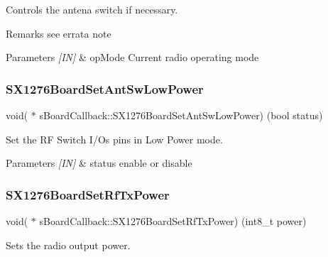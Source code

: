 Controls the antena switch if necessary. 

\begin{DoxyRemark}{Remarks}
see errata note
\end{DoxyRemark}

\begin{DoxyParams}{Parameters}
{\em \mbox{[}\+I\+N\mbox{]}} & op\+Mode Current radio operating mode \\
\hline
\end{DoxyParams}
\mbox{\label{structsBoardCallback_a91d44db14871cfcf950cce928922ba17}} 
\subsubsection{\texorpdfstring{S\+X1276\+Board\+Set\+Ant\+Sw\+Low\+Power}{SX1276BoardSetAntSwLowPower}}
{\footnotesize\ttfamily void( $\ast$ s\+Board\+Callback\+::\+S\+X1276\+Board\+Set\+Ant\+Sw\+Low\+Power) (bool status)}



Set the RF Switch I/\+Os pins in Low Power mode. 


\begin{DoxyParams}{Parameters}
{\em \mbox{[}\+I\+N\mbox{]}} & status enable or disable \\
\hline
\end{DoxyParams}
\mbox{\label{structsBoardCallback_aec7b6d1c4de061f3d2f1bebe75c64c13}} 
\subsubsection{\texorpdfstring{S\+X1276\+Board\+Set\+Rf\+Tx\+Power}{SX1276BoardSetRfTxPower}}
{\footnotesize\ttfamily void( $\ast$ s\+Board\+Callback\+::\+S\+X1276\+Board\+Set\+Rf\+Tx\+Power) (int8\+\_\+t power)}



Sets the radio output power. 



